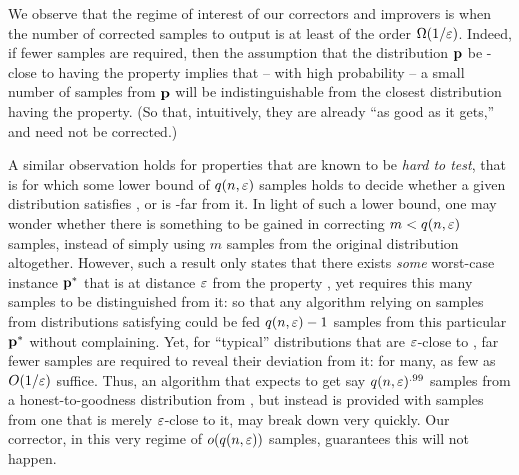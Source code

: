 \begin{remark}
We observe that the regime of interest of our correctors and improvers is when the number of corrected samples to output is at least of the order $\bigOmega{1/\eps}$. Indeed, if fewer samples are required, then the assumption that the distribution $\mathbf{p}$ be \eps-close to having the property implies that -- with high probability -- a small number of samples from $\mathbf{p}$ will be indistinguishable from the closest distribution having the property. (So that, intuitively, they are already ``as good as it gets,'' and need not be corrected.)
\end{remark}
\begin{remark}\label{rk:samples:lb:pt}
A similar observation holds for properties \property that are known to be \emph{hard to test}, that is for which some lower bound of $q(n,\varepsilon)$ samples holds to decide whether a given distribution satisfies \property, or is \eps-far from it. In light of such a lower bound, one may wonder whether there is something to be gained in correcting $m< q(n,\varepsilon)$ samples, instead of simply using $m$ samples from the original distribution altogether. However, such a result only states that there exists \emph{some} worst-case instance $\mathbf{p}^\ast$ that is at distance $\varepsilon$ from the property \property, yet requires this many samples to be distinguished from it: so that any algorithm relying on samples from distributions satisfying \property could be fed $q(n,\varepsilon)-1$ samples from this particular $\mathbf{p}^\ast$ without complaining. Yet, for ``typical'' distributions that are $\varepsilon$-close to \property, far fewer samples are required to reveal their deviation from it: for many, as few as $O(1/\varepsilon)$ suffice. Thus, an algorithm that expects to get say $q(n,\varepsilon)^{.99}$ samples from a honest-to-goodness distribution from \property, but instead is provided with samples from one that is merely $\varepsilon$-close to it, may break down very quickly. Our corrector, in this very regime of $\littleO{q(n,\eps)}$ samples, guarantees this will not happen.
\end{remark}

